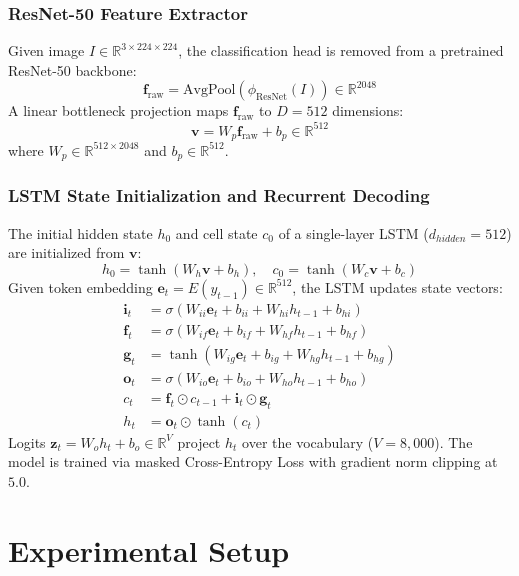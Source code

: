 \documentclass[conference]{IEEEtran}
\begin{document}
\subsubsection{ResNet-50 Feature Extractor}
Given image $I \in \mathbb{R}^{3 \times 224 \times 224}$, the classification head is removed from a pretrained ResNet-50 backbone:
\begin{equation}
\mathbf{f}_{\text{raw}} = \text{AvgPool}(\phi_{\text{ResNet}}(I)) \in \mathbb{R}^{2048}
\end{equation}
A linear bottleneck projection maps $\mathbf{f}_{\text{raw}}$ to $D=512$ dimensions:
\begin{equation}
\mathbf{v} = W_p \mathbf{f}_{\text{raw}} + b_p \in \mathbb{R}^{512}
\end{equation}
where $W_p \in \mathbb{R}^{512 \times 2048}$ and $b_p \in \mathbb{R}^{512}$.

\subsubsection{LSTM State Initialization and Recurrent Decoding}
The initial hidden state $h_0$ and cell state $c_0$ of a single-layer LSTM ($d_{hidden}=512$) are initialized from $\mathbf{v}$:
\begin{equation}
h_0 = \tanh(W_h \mathbf{v} + b_h), \quad c_0 = \tanh(W_c \mathbf{v} + b_c)
\end{equation}
Given token embedding $\mathbf{e}_t = E(y_{t-1}) \in \mathbb{R}^{512}$, the LSTM updates state vectors:
\begin{align}
\mathbf{i}_t &= \sigma(W_{ii} \mathbf{e}_t + b_{ii} + W_{hi} h_{t-1} + b_{hi}) \\
\mathbf{f}_t &= \sigma(W_{if} \mathbf{e}_t + b_{if} + W_{hf} h_{t-1} + b_{hf}) \\
\mathbf{g}_t &= \tanh(W_{ig} \mathbf{e}_t + b_{ig} + W_{hg} h_{t-1} + b_{hg}) \\
\mathbf{o}_t &= \sigma(W_{io} \mathbf{e}_t + b_{io} + W_{ho} h_{t-1} + b_{ho}) \\
c_t &= \mathbf{f}_t \odot c_{t-1} + \mathbf{i}_t \odot \mathbf{g}_t \\
h_t &= \mathbf{o}_t \odot \tanh(c_t)
\end{align}
Logits $\mathbf{z}_t = W_o h_t + b_o \in \mathbb{R}^{V}$ project $h_t$ over the vocabulary ($V=8,000$). The model is trained via masked Cross-Entropy Loss with gradient norm clipping at $5.0$.

\section{Experimental Setup}
\label{sec:experiments}
\end{document}

